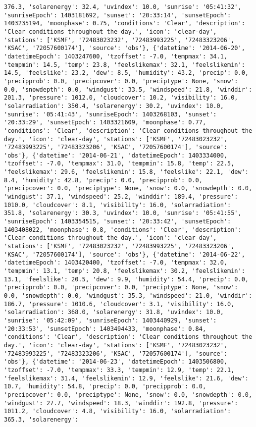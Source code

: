 \documentclass[
  letterpaper,
  DIV=11,
  numbers=noendperiod]{scrartcl}
\begin{document}
\begin{verbatim}
376.3, 'solarenergy': 32.4, 'uvindex': 10.0, 'sunrise': '05:41:32', 'sunriseEpoch': 1403181692, 'sunset': '20:33:14', 'sunsetEpoch': 1403235194, 'moonphase': 0.75, 'conditions': 'Clear', 'description': 'Clear conditions throughout the day.', 'icon': 'clear-day', 'stations': ['KSMF', '72483023232', '72483993225', '72483323206', 'KSAC', '72057600174'], 'source': 'obs'}, {'datetime': '2014-06-20', 'datetimeEpoch': 1403247600, 'tzoffset': -7.0, 'tempmax': 34.1, 'tempmin': 14.5, 'temp': 23.8, 'feelslikemax': 32.1, 'feelslikemin': 14.5, 'feelslike': 23.2, 'dew': 8.5, 'humidity': 43.2, 'precip': 0.0, 'precipprob': 0.0, 'precipcover': 0.0, 'preciptype': None, 'snow': 0.0, 'snowdepth': 0.0, 'windgust': 33.5, 'windspeed': 21.8, 'winddir': 201.3, 'pressure': 1012.0, 'cloudcover': 10.2, 'visibility': 16.0, 'solarradiation': 350.4, 'solarenergy': 30.2, 'uvindex': 10.0, 'sunrise': '05:41:43', 'sunriseEpoch': 1403268103, 'sunset': '20:33:29', 'sunsetEpoch': 1403321609, 'moonphase': 0.77, 'conditions': 'Clear', 'description': 'Clear conditions throughout the day.', 'icon': 'clear-day', 'stations': ['KSMF', '72483023232', '72483993225', '72483323206', 'KSAC', '72057600174'], 'source': 'obs'}, {'datetime': '2014-06-21', 'datetimeEpoch': 1403334000, 'tzoffset': -7.0, 'tempmax': 31.0, 'tempmin': 15.8, 'temp': 22.5, 'feelslikemax': 29.6, 'feelslikemin': 15.8, 'feelslike': 22.1, 'dew': 8.4, 'humidity': 42.8, 'precip': 0.0, 'precipprob': 0.0, 'precipcover': 0.0, 'preciptype': None, 'snow': 0.0, 'snowdepth': 0.0, 'windgust': 37.1, 'windspeed': 25.2, 'winddir': 189.4, 'pressure': 1010.0, 'cloudcover': 8.1, 'visibility': 16.0, 'solarradiation': 351.8, 'solarenergy': 30.3, 'uvindex': 10.0, 'sunrise': '05:41:55', 'sunriseEpoch': 1403354515, 'sunset': '20:33:42', 'sunsetEpoch': 1403408022, 'moonphase': 0.8, 'conditions': 'Clear', 'description': 'Clear conditions throughout the day.', 'icon': 'clear-day', 'stations': ['KSMF', '72483023232', '72483993225', '72483323206', 'KSAC', '72057600174'], 'source': 'obs'}, {'datetime': '2014-06-22', 'datetimeEpoch': 1403420400, 'tzoffset': -7.0, 'tempmax': 32.0, 'tempmin': 13.1, 'temp': 20.8, 'feelslikemax': 30.2, 'feelslikemin': 13.1, 'feelslike': 20.5, 'dew': 9.9, 'humidity': 54.4, 'precip': 0.0, 'precipprob': 0.0, 'precipcover': 0.0, 'preciptype': None, 'snow': 0.0, 'snowdepth': 0.0, 'windgust': 35.3, 'windspeed': 21.0, 'winddir': 186.7, 'pressure': 1010.6, 'cloudcover': 3.1, 'visibility': 16.0, 'solarradiation': 368.0, 'solarenergy': 31.8, 'uvindex': 10.0, 'sunrise': '05:42:09', 'sunriseEpoch': 1403440929, 'sunset': '20:33:53', 'sunsetEpoch': 1403494433, 'moonphase': 0.84, 'conditions': 'Clear', 'description': 'Clear conditions throughout the day.', 'icon': 'clear-day', 'stations': ['KSMF', '72483023232', '72483993225', '72483323206', 'KSAC', '72057600174'], 'source': 'obs'}, {'datetime': '2014-06-23', 'datetimeEpoch': 1403506800, 'tzoffset': -7.0, 'tempmax': 33.3, 'tempmin': 12.9, 'temp': 22.1, 'feelslikemax': 31.4, 'feelslikemin': 12.9, 'feelslike': 21.6, 'dew': 10.7, 'humidity': 54.8, 'precip': 0.0, 'precipprob': 0.0, 'precipcover': 0.0, 'preciptype': None, 'snow': 0.0, 'snowdepth': 0.0, 'windgust': 27.7, 'windspeed': 18.3, 'winddir': 192.8, 'pressure': 1011.2, 'cloudcover': 4.8, 'visibility': 16.0, 'solarradiation': 365.3, 'solarenergy': 
\end{verbatim}
\end{document}
